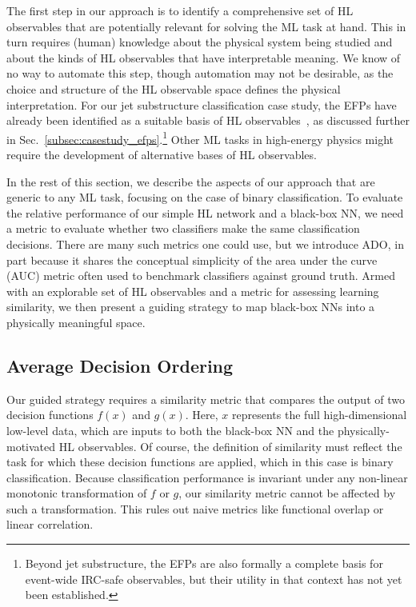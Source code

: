 \documentclass[aps,prd,twocolumn,superscriptaddress,preprintnumbers,nofootinbib,longbibliography,floatfix]{revtex4-1}
\newcommand{\Sec}[1]{Sec.~\ref{#1}}
\begin{document}
The first step in our approach is to identify a comprehensive set of HL observables that are potentially relevant for solving the ML task at hand. This in turn requires (human) knowledge about the physical system being studied and about the kinds of HL observables that have interpretable meaning. We know of no way to automate this step, though automation may not be desirable, as the choice and structure of the HL observable space defines the physical interpretation. For our jet substructure classification case study, the EFPs have already been identified as a suitable basis of HL observables~\cite{Komiske:2017aww}, as discussed further in \Sec{subsec:casestudy_efps}.\footnote{Beyond jet substructure, the EFPs are also formally a complete basis for event-wide IRC-safe observables, but their utility in that context has not yet been established.} Other ML tasks in high-energy physics might require the development of alternative bases of HL observables.

In the rest of this section, we describe the aspects of our approach that are generic to any ML task, focusing on the case of binary classification. To evaluate the relative performance of our simple HL network and a black-box NN, we need a metric to evaluate whether two classifiers make the same classification decisions. There are many such metrics one could use, but we introduce ADO, in part because it shares the conceptual simplicity of the area under the curve (AUC) metric often used to benchmark classifiers against ground truth. Armed with an explorable set of HL observables and a metric for assessing learning similarity, we then present a guiding strategy to map black-box NNs into a physically meaningful space.

\subsection{Average Decision Ordering}
\label{subsec:strategy_ado}
Our guided strategy requires a similarity metric that compares the output of two decision functions $f(x)$ and $g(x)$. Here, $x$ represents the full high-dimensional low-level  data, which are inputs to both the black-box NN and the physically-motivated HL observables. Of course, the definition of similarity must reflect the task for which these decision functions are applied, which in this case is binary classification. Because classification performance is invariant under any non-linear monotonic transformation of $f$ or $g$, our similarity metric cannot be affected by such a transformation. This rules out naive metrics like functional overlap or linear correlation.
\end{document}
